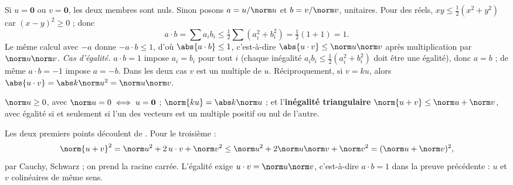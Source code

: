 \begin{preuve}
Si $u=\mathbf 0$ ou $v=\mathbf 0$, les deux membres sont nuls. Sinon posons $a=u/\norm u$ et $b=v/\norm v$, unitaires. Pour des réels, $xy\le\frac12(x^2+y^2)$ car $(x-y)^2\ge0$ ; donc
\[a\cdot b=\sum a_ib_i\le\tfrac12\sum(a_i^2+b_i^2)=\tfrac12(1+1)=1.\]
Le même calcul avec $-a$ donne $-a\cdot b\le1$, d'où $\abs{a\cdot b}\le1$, c'est-à-dire $\abs{u\cdot v}\le\norm u\norm v$ après multiplication par $\norm u\norm v$.
\emph{Cas d'égalité.} $a\cdot b=1$ impose $a_i=b_i$ pour tout $i$ (chaque inégalité $a_ib_i\le\frac12(a_i^2+b_i^2)$ doit être une égalité), donc $a=b$ ; de même $a\cdot b=-1$ impose $a=-b$. Dans les deux cas $v$ est un multiple de $u$. Réciproquement, si $v=ku$, alors $\abs{u\cdot v}=\abs k\norm u^2=\norm u\norm v$.
\end{preuve}
\begin{proposition}[Norme]\label{prop-norme}
$\norm u\ge0$, avec $\norm u=0\iff u=\mathbf 0$ ; $\norm{ku}=\abs k\norm u$ ; et l'\textbf{inégalité triangulaire} $\norm{u+v}\le\norm u+\norm v$, avec égalité si et seulement si l'un des vecteurs est un multiple positif ou nul de l'autre.
\end{proposition}
\begin{preuve}
Les deux premiers points découlent de . Pour le troisième :
\[\norm{u+v}^2=\norm u^2+2\,u\cdot v+\norm v^2\le\norm u^2+2\norm u\norm v+\norm v^2=(\norm u+\norm v)^2,\]
par Cauchy, Schwarz ; on prend la racine carrée. L'égalité exige $u\cdot v=\norm u\norm v$, c'est-à-dire $a\cdot b=1$ dans la preuve précédente : $u$ et $v$ colinéaires de même sens.
\end{preuve}

